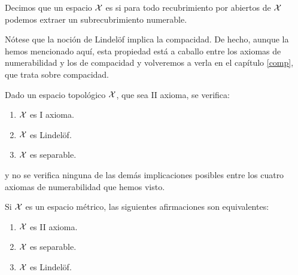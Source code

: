 \begin{defi}[Lindelöf]
	Decimos que un espacio $\mathcal{X}$ es  si para todo recubrimiento por abiertos de $\mathcal{X}$ podemos extraer un subrecubrimiento numerable.
\end{defi}

\begin{obs}
	Nótese que la noción de Lindelöf implica la compacidad. De hecho, aunque la hemos mencionado aquí, esta propiedad está a caballo entre los axiomas de numerabilidad y los de compacidad y volveremos a verla en el capítulo \ref{comp}, que trata sobre compacidad.
\end{obs}

\begin{prop}
	Dado un espacio topológico $\mathcal{X}$, que sea II axioma, se verifica:
	\begin{enumerate}
		\item $\mathcal{X}$ es I axioma.
		\item $\mathcal{X}$ es Lindelöf.
		\item $\mathcal{X}$ es separable.
	\end{enumerate}
	y no se verifica ninguna de las demás implicaciones posibles entre los cuatro axiomas de numerabilidad que hemos visto.
\end{prop}

\begin{obs}
	Si $\mathcal{X}$ es un espacio métrico, las siguientes afirmaciones son equivalentes:
	\begin{enumerate}
		\item $\mathcal{X}$ es II axioma.
		\item $\mathcal{X}$ es separable.
		\item $\mathcal{X}$ es Lindelöf. \qedhere
	\end{enumerate}
\end{obs}

